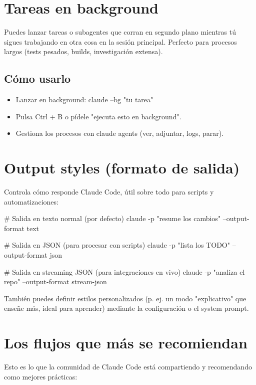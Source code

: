 \documentclass[11pt,a4paper]{book}
\begin{document}
\section{Tareas en background}
Puedes lanzar tareas o subagentes que corran en segundo plano mientras tú sigues trabajando en otra cosa en la sesión principal. Perfecto para procesos largos (tests pesados, builds, investigación extensa).

\subsection{Cómo usarlo}
\begin{itemize}\item Lanzar en background: claude --bg "tu tarea"\end{itemize}
\begin{itemize}\item Pulsa Ctrl + B o pídele "ejecuta esto en background".\end{itemize}
\begin{itemize}\item Gestiona los procesos con claude agents (ver, adjuntar, logs, parar).\end{itemize}
\section{Output styles (formato de salida)}
Controla cómo responde Claude Code, útil sobre todo para scripts y automatizaciones:

\begin{codebox}
# Salida en texto normal (por defecto)
claude -p "resume los cambios" --output-format text

# Salida en JSON (para procesar con scripts)
claude -p "lista los TODO" --output-format json

# Salida en streaming JSON (para integraciones en vivo)
claude -p "analiza el repo" --output-format stream-json
\end{codebox}
También puedes definir estilos personalizados (p. ej. un modo "explicativo" que enseñe más, ideal para aprender) mediante la configuración o el system prompt.

\section{Los flujos que más se recomiendan}
Esto es lo que la comunidad de Claude Code está compartiendo y recomendando como mejores prácticas:
\end{document}
